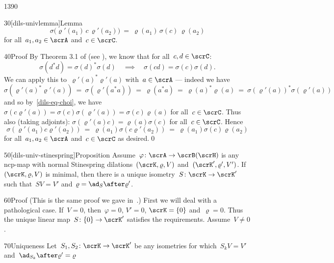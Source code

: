 \begin{parsec}{1390}
\begin{point}{30}[dils-univlemma]{Lemma}
\begin{equation*}
\sigma\bigl(\varrho'(a_1)\,c\, \varrho'(a_2)\bigr) \ =\   \varrho(a_1) \,\sigma(c) \,\varrho(a_2)
\end{equation*}
    for all~$a_1,a_2 \in \scrA$ and~$c \in \scrC$.
\begin{point}{40}{Proof}%
By Theorem 3.1 of \cite{choi} (see ),
we know that for all~$c,d\in\scrC$:
\begin{equation}
    \sigma(d^*d) = \sigma(d)^*\sigma(d) \quad \implies \quad
    \sigma(cd) = \sigma(c)\sigma(d).\label{dils-eq-choi}
\end{equation}
We can apply this to~$\varrho'(a)^*\varrho'(a)$
with~$a \in \scrA$ --- indeed we have
\begin{equation*}
\sigma(\varrho'(a)^* \varrho'(a))
  \   =\ \sigma(\varrho'(a^*a))
  \  =\ \varrho(a^*a)
  \  =\ \varrho(a)^*\varrho(a)
  \  =\ \sigma(\varrho'(a))^*\sigma(\varrho'(a))
\end{equation*}
and so by~\eqref{dils-eq-choi},
    we have~$\sigma(c\varrho'(a))
        = \sigma(c)\sigma(\varrho'(a)) = \sigma(c)\varrho(a)$
        for all~$c \in \scrC$.
Thus also (taking adjoints):
$\sigma(\varrho'(a)c) = \varrho(a)\sigma(c)$ for all~$c \in \scrC$.
Hence
\begin{equation*}
\sigma(\varrho'(a_1)c\varrho'(a_2))
            \ =\  \varrho(a_1)\sigma(c \varrho'(a_2))
            \ =\  \varrho(a_1) \sigma(c) \varrho(a_2)
\end{equation*}
    for all~$a_1,a_2 \in \scrA$ and~$c\in \scrC$ as desired.\qed
\end{point}
\end{point}
\begin{point}{50}[dils-univ-stinespring]{Proposition}%
    Assume~$\varphi\colon \scrA \to \scrB(\scrH)$
        is any ncp-map with normal
        Stinespring dilations~$(\scrK, \varrho, V)$
    and~$(\scrK', \varrho', V')$.
        If~$(\scrK,\varrho,V)$ is minimal,
        then there is a unique isometry~$S\colon \scrK \to \scrK'$
        such that~$SV=V'$ and~$\varrho = \ad_S\after \varrho'$.
\begin{point}{60}{Proof}
(This is the same proof we gave in~\cite{wwpaschke}.)
First we will deal with a pathological case.
If~$V = 0$, then~$\varphi = 0$, $V' = 0$, $\scrK = \{0\}$
and~$\varrho = 0$.  Thus the unique linear map~$S\colon \{0\} \to \scrK'$
satisfies the requirements.  Assume~$V \neq 0$.
\begin{point}{70}{Uniqueness}%
Let~$S_1,S_2\colon \scrK \to \scrK'$
be any isometries for which~$S_k V = V'$ and~$\ad_{S_k} \after \varrho' = \varrho$

\end{point}
\end{point}
\end{point}
\end{parsec}

